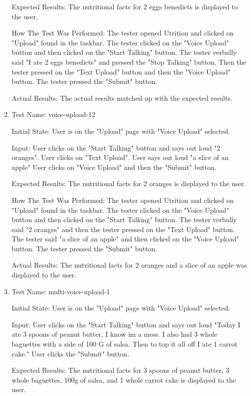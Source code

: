\documentclass[12pt, titlepage]{article}
\begin{document}
\begin{enumerate}
		Expected Results: The nutritional facts for 2 eggs benedicts is displayed to the user.
		
		How The Test Was Performed: The tester opened Utrition and clicked on "Upload" found in the taskbar. The tester clicked on the "Voice Upload" button and then clicked on the "Start Talking" button. The tester verbally said "I ate 2 eggs benedicts" and pressed the "Stop Talking" button. Then the tester pressed on the "Text Upload" button and then the "Voice Upload" button. The tester pressed the "Submit" button.
		
		Actual Results: The actual results matched up with the expected results.
		
		\item{Test Name: voice-upload-12}
		
		Initial State: User is on the "Upload" page with "Voice Upload" selected.
		
		Input: User clicks on the "Start Talking" button and says out loud "2 oranges". User clicks on "Text Upload". User says out loud "a slice of an apple" User clicks on "Voice Upload" and then the "Submit" button.
		
		Expected Results: The nutritional facts for 2 oranges is displayed to the user.
		
		How The Test Was Performed: The tester opened Utrition and clicked on "Upload" found in the taskbar. The tester clicked on the "Voice Upload" button and then clicked on the "Start Talking" button. The tester verbally said "2 oranges" and then the tester pressed on the "Text Upload" button. The tester said "a slice of an apple" and then clicked on the "Voice Upload" button. The tester pressed the "Submit" button.
		
		Actual Results: The nutritional facts for 2 oranges and a slice of an apple was displayed to the user.
		
		\item{Test Name: multi-voice-upload-1}
		
		Initial State: User is on the "Upload" page with "Voice Upload" selected.
		
		Input: User clicks on the "Start Talking" button and says out loud "Today I ate 3 spoons of peanut butter, I know im a mess. I also had 3 whole baguettes with a side of 100 G of salsa. Then to top it all off I ate 1 carrot cake." User clicks the "Submit" button.
		
		Expected Results: The nutritional facts for 3 spoons of peanut butter, 3 whole baguettes, 100g of salsa, and 1 whole carrot cake is displayed to the user.
		

\end{enumerate}
\end{document}
